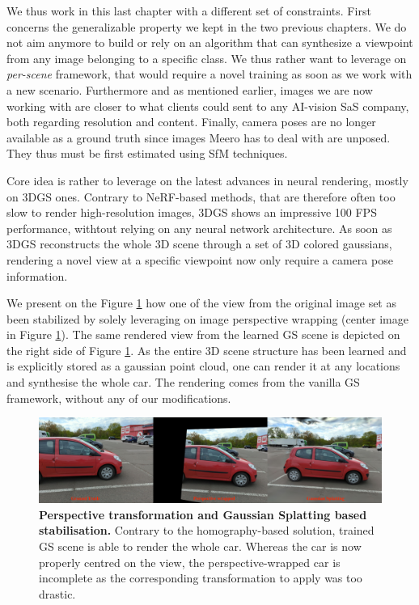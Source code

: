 We thus work in this last chapter with a different set of constraints. First concerns the generalizable property we kept in the two previous chapters. We do not aim anymore to build or rely on an algorithm that can synthesize a viewpoint from any image belonging to a specific class. We thus rather want to leverage on \textit{per-scene} framework, that would require a novel training as soon as we work with a new scenario. Furthermore and as mentioned earlier, images we are now working with are closer to what clients could sent to any \ac{AI}-vision SaS company, both regarding resolution and content. Finally, camera poses are no longer available as a ground truth since images Meero has to deal with are unposed. They thus must be first estimated using \ac{SfM} techniques.

Core idea is rather to leverage on the latest advances in neural rendering, mostly on 3D\ac{GS} ones. Contrary to \ac{NeRF}-based methods, that are therefore often too slow to render high-resolution images, 3D\ac{GS} shows an impressive 100 \ac{FPS} performance, withtout relying on any neural network architecture. As soon as 3D\ac{GS} reconstructs the whole 3D scene through a set of 3D colored gaussians, rendering a novel view at a specific viewpoint now only require a camera pose information.

We present on the Figure \ref{fig:gs-vs-homography-view3} how one of the view from the original image set as been stabilized by solely leveraging on image perspective wrapping (center image in Figure \ref{fig:gs-vs-homography-view3}). The same rendered view from the learned \ac{GS} scene is depicted on the right side of Figure \ref{fig:gs-vs-homography-view3}. As the entire 3D scene structure has been learned and is explicitly stored as a gaussian point cloud, one can render it at any locations and synthesise the whole car. The rendering comes from the vanilla \ac{GS} framework, without any of our modifications.

\begin{figure}[htb!]
  \center
\includegraphics[width=\linewidth]{images/gaussiansplatting/perspective-vs-gs.png}
\caption{\textbf{Perspective transformation and Gaussian Splatting based stabilisation. } Contrary to the homography-based solution, trained GS scene is able to render the whole car. Whereas the car is now properly centred on the view, the perspective-wrapped car is incomplete as the corresponding transformation to apply was too drastic.}
\label{fig:gs-vs-homography-view3}
\end{figure}

